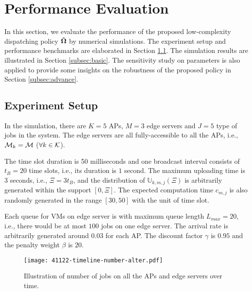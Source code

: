 \section{Performance Evaluation}
\label{sec:evaluation}
In this section, we evaluate the performance of the proposed low-complexity dispatching policy $\tilde{\boldsymbol{\Omega}}$ by numerical simulations.
The experiment setup and performance benchmarks are elaborated in Section \ref{subsec:setup}.
The simulation results are illustrated in Section \ref{subsec:basic}.
The sensitivity study on parameters is also applied to provide some insights on the robustness of the proposed policy in Section \ref{subsec:advance}.

\subsection{Experiment Setup}
\label{subsec:setup}
In the simulation, there are $K=5$ APs, $M=3$ edge servers and $J=5$ type of jobs in the system.
The edge servers are all fully-accessible to all the APs, i.e., $\mathcal{M}_{k}=\mathcal{M}$ ($\forall k\in\mathcal{K}$).

The time slot duration is 50 milliseconds and one broadcast interval consists of $t_{B}=20$ time slots, i.e., its duration is $1$ second.
The maximum uploading time is $3$ seconds, i.e., $\Xi = 3t_B$, and the distribution of $\mathbb{U}_{k,m,j}(\Xi)$ is arbitrarily generated within the support $[0, \Xi]$.
The expected computation time $c_{m,j}$ is also randomly generated in the range $[30,50]$ with the unit of time slot.

Each queue for VMs on edge server is with maximum queue length $L_{max}=20$, i.e., there would be at most $100$ jobs on one edge server.
The arrival rate is arbitrarily generated around $0.03$ for each AP.
The discount factor $\gamma$ is $0.95$ and the penalty weight $\beta$ is $20$.

\begin{figure}[ht!]                                                                             %
    \centering                                                                                  %
    \texttt{[image: 41122-timeline-number-alter.pdf]}                     %
    \caption{Illustration of number of jobs on all the APs and edge servers over time.}
    \label{fig:general_timeline}                                                                %
\end{figure}                                                                                    %

